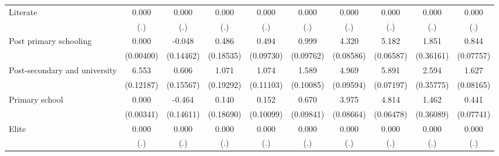{\begin{tabular}{l*{9}{c}}
Literate            &       0.000         &       0.000         &       0.000         &       0.000         &       0.000         &       0.000         &       0.000         &       0.000         &       0.000         \\
                    &         (.)         &         (.)         &         (.)         &         (.)         &         (.)         &         (.)         &         (.)         &         (.)         &         (.)         \\
Post primary schooling&       0.000         &      -0.048         &       0.486\sym{**} &       0.494\sym{***}&       0.999\sym{***}&       4.320\sym{***}&       5.182\sym{***}&       1.851\sym{***}&       0.844\sym{***}\\
                    &   (0.00400)         &   (0.14462)         &   (0.18535)         &   (0.09730)         &   (0.09762)         &   (0.08586)         &   (0.06587)         &   (0.36161)         &   (0.07757)         \\
Post-secondary and university&       6.553\sym{***}&       0.606\sym{***}&       1.071\sym{***}&       1.074\sym{***}&       1.589\sym{***}&       4.969\sym{***}&       5.891\sym{***}&       2.594\sym{***}&       1.627\sym{***}\\
                    &   (0.12187)         &   (0.15567)         &   (0.19292)         &   (0.11103)         &   (0.10085)         &   (0.09594)         &   (0.07197)         &   (0.35775)         &   (0.08165)         \\
Primary school      &       0.000         &      -0.464\sym{**} &       0.140         &       0.152         &       0.670\sym{***}&       3.975\sym{***}&       4.814\sym{***}&       1.462\sym{***}&       0.441\sym{***}\\
                    &   (0.00341)         &   (0.14611)         &   (0.18690)         &   (0.10099)         &   (0.09841)         &   (0.08664)         &   (0.06478)         &   (0.36089)         &   (0.07741)         \\
Elite               &       0.000         &       0.000         &       0.000         &       0.000         &       0.000         &       0.000         &       0.000         &       0.000         &       0.000         \\
                    &         (.)         &         (.)         &         (.)         &         (.)         &         (.)         &         (.)         &         (.)         &         (.)         &         (.)         \\

\end{tabular}}
